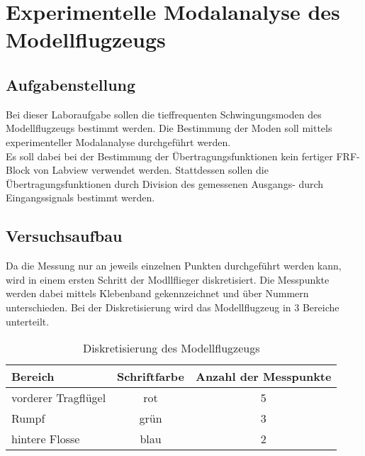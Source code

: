 \chapter{Experimentelle Modalanalyse des Modellflugzeugs}
\label{sec: Hauptkapitel 1}

\section{Aufgabenstellung}
    Bei dieser Laboraufgabe sollen die tieffrequenten Schwingungsmoden des
    Modellflugzeugs bestimmt werden. Die Bestimmung der Moden soll mittels
    experimenteller Modalanalyse durchgeführt werden.
    \\

    \noindent
    Es soll dabei bei der Bestimmung der Übertragungsfunktionen kein fertiger
    FRF-Block von Labview verwendet werden. Stattdessen sollen die
    Übertragungsfunktionen durch Division des gemessenen Ausgangs- durch
    Eingangssignals bestimmt werden.

\section{Versuchsaufbau}
    Da die Messung nur an jeweils einzelnen Punkten durchgeführt werden kann,
    wird in einem ersten Schritt der Modllflieger diskretisiert. Die Messpunkte
    werden dabei mittels Klebenband gekennzeichnet und über Nummern
    unterschieden. Bei der Diskretisierung wird das Modellflugzeug in 3 Bereiche
    unterteilt.

    \begin{table}[h]
        \centering
        \begin{tabular}{|l|c|c|}
            \hline
            \textbf{Bereich} &   \textbf{Schriftfarbe}    &   \textbf{Anzahl der Messpunkte}   \\
            \hline \hline
            vorderer Tragflügel &   rot &   5   \\
            \hline
            Rumpf   &   grün    &   3   \\
            \hline
            hintere Flosse  &   blau    &   2   \\
            \hline
        \end{tabular}
        \caption{Diskretisierung des Modellflugzeugs}
        \label{tab: Fliegerdiskretisierung}
    \end{table}


